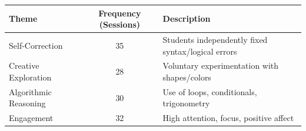 \begin{table}
\centering

\begin{tabular}{@{}l c m{7cm}@{}}
\toprule
\textbf{Theme} & \textbf{Frequency (Sessions)} & \textbf{Description} \\
\midrule
Self-Correction & 35 & Students independently fixed syntax/logical errors \\
Creative Exploration & 28 & Voluntary experimentation with shapes/colors \\
Algorithmic Reasoning & 30 & Use of loops, conditionals, trigonometry \\
Engagement & 32 & High attention, focus, positive affect \\
\bottomrule
\end{tabular}

\end{table}